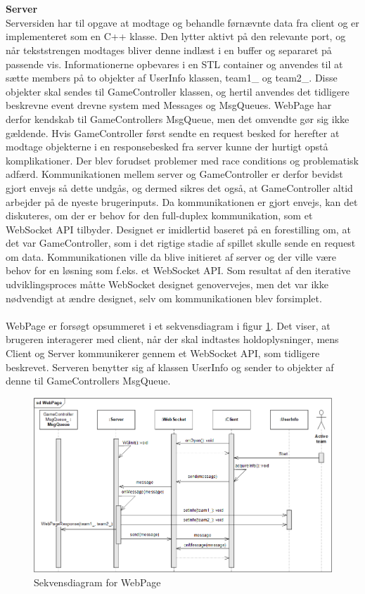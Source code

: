 \documentclass[Rapport/Rapport_main.tex]{subfiles}
\begin{document}
\\\\\textbf{Server}
\\Serversiden har til opgave at modtage og behandle førnævnte data fra client og er implementeret som en C++ klasse. Den lytter aktivt på den relevante port, og når tekststrengen modtages bliver denne indlæst i en buffer og separaret på passende vis. Informationerne opbevares i en STL container og anvendes til at sætte members på to objekter af UserInfo klassen, team1\_ og team2\_. Disse objekter skal sendes til GameController klassen, og hertil anvendes det tidligere beskrevne event drevne system med Messages og MsgQueues. WebPage har derfor kendskab til GameControllers MsgQueue, men det omvendte gør sig ikke gældende. Hvis GameController først sendte en request besked for herefter at modtage objekterne i en responsebesked fra server kunne der hurtigt opstå komplikationer. Der blev forudset problemer med race conditions og problematisk adfærd. Kommunikationen mellem server og GameController er derfor bevidst gjort envejs så dette undgås, og dermed sikres det også, at GameController altid arbejder på de nyeste brugerinputs. Da kommunikationen er gjort envejs, kan det diskuteres, om der er behov for den full-duplex kommunikation, som et WebSocket API tilbyder. Designet er imidlertid baseret på en forestilling om, at det var GameController, som i det rigtige stadie af spillet skulle sende en request om data. Kommunikationen ville da blive initieret af server og der ville være behov for en løsning som f.eks. et WebSocket API. Som resultat af den iterative udviklingsproces måtte WebSocket designet genovervejes, men det var ikke nødvendigt at ændre designet, selv om kommunikationen blev forsimplet.\\\\WebPage er forsøgt opsummeret i et sekvensdiagram i figur \ref{fig:WebPage_sequence_diagram}. Det viser, at brugeren interagerer med client, når der skal indtastes holdoplysninger, mens Client og Server kommunikerer gennem et WebSocket API, som tidligere beskrevet. Serveren benytter sig af klassen UserInfo og sender to objekter af denne til GameControllers MsgQueue.  
\begin{figure}[H]
    \centering
    \includegraphics[width=1\textwidth]{Softwaredesign/RPiApp/graphic_RPi/WebPage_sd_2.png}
    \caption{Sekvensdiagram for WebPage}
    \label{fig:WebPage_sequence_diagram}
\end{figure}
\end{document}
